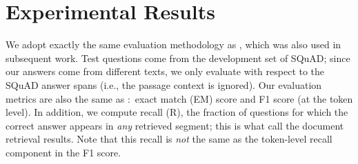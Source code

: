 \documentclass[11pt,a4paper]{article}
\begin{document}
\section{Experimental Results}

\begin{table}[t]
\centering{}
\caption{Results on  development questions.}
\label{table:main}
\end{table}

We adopt exactly the same evaluation methodology as \citet{P17-1171}, which was also used in subsequent work.
Test questions come from the development set of SQuAD; since our answers come from different texts, we only evaluate with respect to the SQuAD answer spans (i.e., the passage context is ignored).
Our evaluation metrics are also the same as \citet{P17-1171}:\ exact match (EM) score and F1 score (at the token level).
In addition, we compute recall (R), the fraction of questions for which the correct answer appears in {\it any} retrieved segment; this is what \citet{P17-1171} call the document retrieval results.
Note that this recall is {\it not} the same as the token-level recall component in the F1 score.
\end{document}
